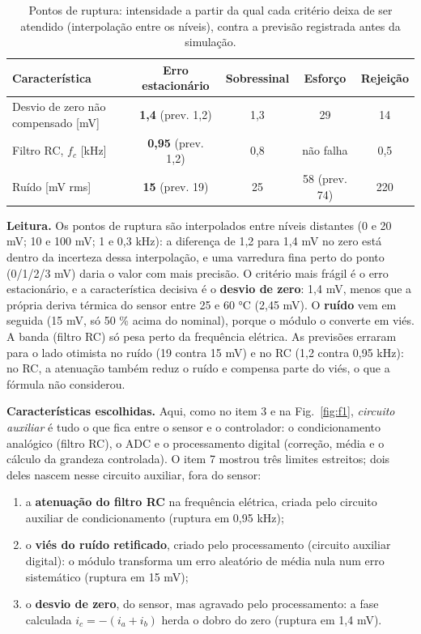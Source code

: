 \documentclass[10pt,a4paper]{article}
\newcommand{\R}[1]{\FloatBarrier\par\medskip\noindent{\large\bfseries #1}\par\smallskip}
\begin{document}
\begin{table}[!htbp]\centering\footnotesize
\caption{Pontos de ruptura: intensidade a partir da qual cada critério deixa de ser atendido (interpolação entre os níveis), contra a previsão registrada antes da simulação.}\label{tab:rup}
\begin{tabular}{lcccc}\toprule
Característica & Erro estacionário & Sobressinal & Esforço & Rejeição\\\midrule
Desvio de zero não compensado [mV] & \textbf{1,4} (prev. 1,2) & 1,3 & 29 & 14\\
Filtro RC, $f_c$ [kHz] & \textbf{0,95} (prev. 1,2) & 0,8 & não falha & 0,5\\
Ruído [mV rms] & \textbf{15} (prev. 19) & 25 & 58 (prev. 74) & 220\\\bottomrule
\end{tabular}
\end{table}

\textbf{Leitura.} Os pontos de ruptura são interpolados entre níveis distantes (0 e 20 mV; 10 e 100 mV; 1 e 0,3 kHz): a diferença de 1,2 para 1,4 mV no zero está dentro da incerteza dessa interpolação, e uma varredura fina perto do ponto (0/1/2/3 mV) daria o valor com mais precisão. O critério mais frágil é o erro estacionário, e a característica decisiva é o \textbf{desvio de zero}: 1,4 mV, menos que a própria deriva térmica do sensor entre 25 e 60 °C (2,45 mV). O \textbf{ruído} vem em seguida (15 mV, só 50 \% acima do nominal), porque o módulo o converte em viés. A banda (filtro RC) só pesa perto da frequência elétrica. As previsões erraram para o lado otimista no ruído (19 contra 15 mV) e no RC (1,2 contra 0,95 kHz): no RC, a atenuação também reduz o ruído e compensa parte do viés, o que a fórmula não considerou.

\R{8. Compensação e circuitos auxiliares}
\textbf{Características escolhidas.} Aqui, como no item 3 e na Fig.~\ref{fig:f1}, \emph{circuito auxiliar} é tudo o que fica entre o sensor e o controlador: o condicionamento analógico (filtro RC), o ADC e o processamento digital (correção, média e o cálculo da grandeza controlada). O item 7 mostrou três limites estreitos; dois deles nascem nesse circuito auxiliar, fora do sensor:
\begin{enumerate}
\item a \textbf{atenuação do filtro RC} na frequência elétrica, criada pelo circuito auxiliar de condicionamento (ruptura em 0,95 kHz);
\item o \textbf{viés do ruído retificado}, criado pelo processamento (circuito auxiliar digital): o módulo transforma um erro aleatório de média nula num erro sistemático (ruptura em 15 mV);
\item o \textbf{desvio de zero}, do sensor, mas agravado pelo processamento: a fase calculada $i_c = -(i_a+i_b)$ herda o dobro do zero (ruptura em 1,4 mV).
\end{enumerate}
\end{document}

